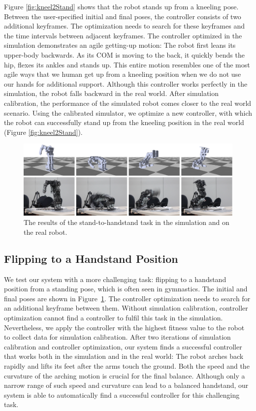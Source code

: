 Figure \ref{fig:kneel2Stand} shows that the robot stands up from a kneeling pose. Between the user-specified initial and final poses, the controller consists of two additional keyframes. The optimization needs to search for these keyframes and the time intervals between adjacent keyframes. The controller optimized in the simulation demonstrates an agile getting-up motion: The robot first leans its upper-body backwards. As its COM is moving to the back, it quickly bends the hip, flexes its ankles and stands up. This entire motion resembles one of the most agile ways that we human get up from a kneeling position when we do not use our hands for additional support. Although this controller works perfectly in the simulation, the robot falls backward in the real world. After simulation calibration, the performance of the simulated robot comes closer to the real world scenario. Using the calibrated simulator, we optimize a new controller, with which the robot can successfully stand up from the kneeling position in the real world (Figure \ref{fig:kneel2Stand}).

\begin{figure}[!t]
  \centering
  \includegraphics[width=\textwidth]{figures/stand2Hand}
  \caption{The results of the stand-to-handstand task in the simulation and on the real robot.}
  \label{fig:stand2Hand}
\end{figure}


\subsection{Flipping to a Handstand Position}
We test our system with a more challenging task: flipping to a handstand position from a standing pose, which is often seen in gymnastics. The initial and final poses are shown in Figure~\ref{fig:stand2Hand}. The controller optimization needs to search for an additional keyframe between them. Without simulation calibration, controller optimization cannot find a controller to fulfil this task in the simulation. Nevertheless, we apply the controller with the highest fitness value to the robot to collect data for simulation calibration. After two iterations of simulation calibration and controller optimization, our system finds a successful controller that works both in the simulation and in the real world: The robot arches back rapidly and lifts its feet after the arms touch the ground. Both the speed and the curvature of the arching motion is crucial for the final balance. Although only a narrow range of such speed and curvature can lead to a balanced handstand, our system is able to automatically find a successful controller for this challenging task.

